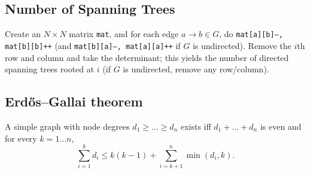 	\subsection{Number of Spanning Trees}
		Create an $N\times N$ matrix \texttt{mat}, and for each edge $a \rightarrow b \in G$, do
		\texttt{mat[a][b]--, mat[b][b]++} (and \texttt{mat[b][a]--, mat[a][a]++} if $G$ is undirected).
		Remove the $i$th row and column and take the determinant; this yields the number of directed spanning trees rooted at $i$
		(if $G$ is undirected, remove any row/column).

	\subsection{Erdős–Gallai theorem}
		A simple graph with node degrees $d_1 \ge \dots \ge d_n$ exists iff $d_1 + \dots + d_n$ is even and for every $k = 1\dots n$,
		\[ \sum _{i=1}^{k}d_{i}\leq k(k-1)+\sum _{i=k+1}^{n}\min(d_{i},k). \]
